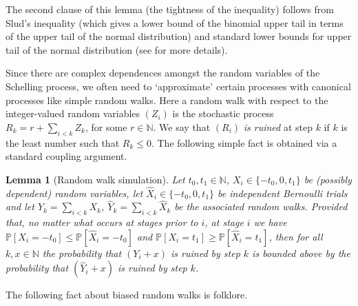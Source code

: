 \documentclass[11pt]{article}
\theoremstyle{plain}
\newtheorem{lem}[thm]{Lemma}
\numberwithin{equation}{subsection}
\newcommand{\Nat}{\mathbb{N}}
\DeclareRobustCommand{\proba}[2][{\mbox{$\mathbb{P}$}}]{\ensuremath {#1} [ {#2} ]}
\begin{document}
The second clause of this lemma (the tightness of the inequality)
follows from Slud's inequality \cite{sludche} (which
gives a lower bound of the binomial upper tail in terms of the upper tail of the
normal distribution) and
standard lower bounds for upper tail of the normal distribution (see \cite{mousavi} for more details).

Since there are complex 
dependences amongst the random variables of the Schelling process,
we often need to `approximate' certain processes with
canonical processes like simple random walks.
Here a random walk with respect to the
integer-valued random variables $(Z_i)$ 
is the stochastic process $R_k= r+\sum_{i<k} Z_k$, for
some $r\in\mathbb{N}$.
We say that $(R_i)$ {\em is ruined} 
at step $k$ if $k$ is the least number such that 
$R_k\leq 0$. The following simple fact is obtained via a standard 
coupling  argument.



\begin{lem}[Random walk simulation]\label{le:ranwalksim}Let $t_0,t_1\in\Nat$, $X_i\in\{-t_0,0,t_1\}$ be (possibly dependent) random variables, let
$\hat{X}_i\in\{-t_0,0,t_1\}$ be independent
Bernoulli trials and let $Y_k= \sum_{i<k} X_k$, 
$\hat{Y}_k=\sum_{i<k} \hat{X}_k$ be the associated random walks. 
Provided that, no matter what occurs at stages prior to $i$, at stage $i$ we have 
$\proba{X_i=-t_0}\leq \mathbb{P}[\hat{X}_i=-t_0]$ and $\proba{X_i=t_1}\geq \mathbb{P}[\hat{X}_i=t_1]$, then 
for all $k,x\in\Nat$
the probability that 
$(Y_i+x)$ is ruined by step $k$ is bounded above by the probability that
$(\hat{Y}_i+x)$ is ruined by step $k$.
\end{lem}


The following fact about biased random walks is folklore.
\end{document}
